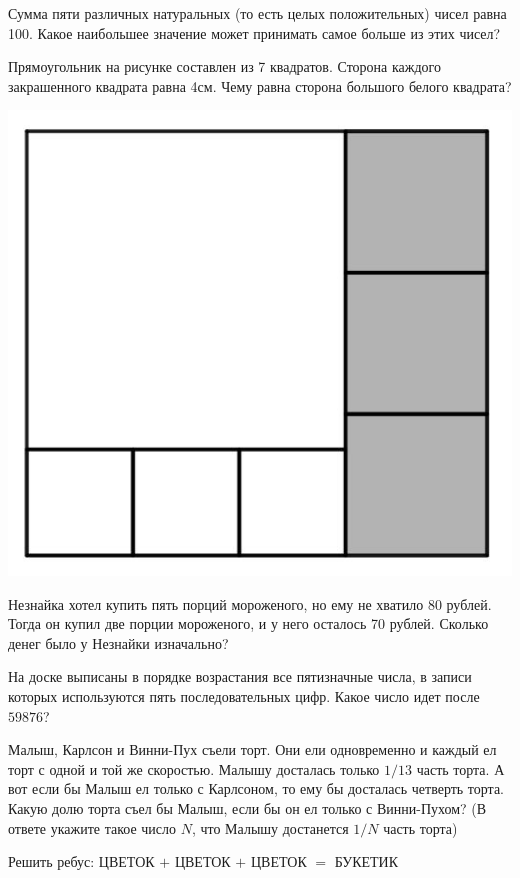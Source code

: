 \begin{listofex}
	\item Сумма пяти различных натуральных (то есть целых положительных) чисел равна 100. Какое
	наибольшее значение может принимать самое больше из этих чисел?
	\item Прямоугольник на рисунке составлен из 7 квадратов. Сторона каждого закрашенного квадрата
	равна 4см. Чему равна сторона большого белого квадрата?
	\begin{center}
		\includegraphics[width=0.3\linewidth]{124.jpg}
	\end{center}
	\item Незнайка хотел купить пять порций мороженого, но ему не хватило 80 рублей. Тогда он купил две порции мороженого, и у него осталось 70 рублей. Сколько денег было у Незнайки изначально?
	\item На доске выписаны в порядке возрастания все пятизначные числа, в записи которых используются
	пять последовательных цифр. Какое число идет после \( 59876 \)?
	\item Малыш, Карлсон и Винни-Пух съели торт. Они ели одновременно и каждый ел торт с одной и
	той же скоростью. Малышу досталась только \( 1/13 \) часть торта. А вот если бы Малыш ел только с Карлсоном, то ему бы досталась четверть торта. Какую долю торта съел бы Малыш, если бы он ел только с Винни-Пухом? (В ответе укажите такое число \( N \), что Малышу достанется \( 1/N \) часть торта)

	\item Решить ребус: ЦВЕТОК \( + \) ЦВЕТОК \( + \) ЦВЕТОК \( = \) БУКЕТИК
\end{listofex}